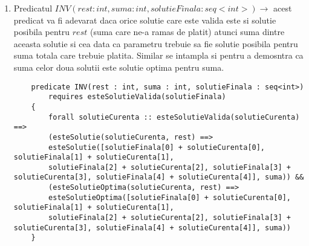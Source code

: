 \begin{enumerate}
\item Predicatul $  INV(rest : int, suma : int, solutieFinala : seq<int>) \rightarrow$ acest predicat va fi adevarat daca orice solutie care este valida este si solutie posibila pentru $rest$ (suma care ne-a ramas de platit) atunci suma dintre aceasta solutie si cea data ca parametru trebuie sa fie solutie posibila pentru suma totala care trebuie platita. Similar se intampla si pentru a demosntra ca suma celor doua solutii este solutie optima pentru suma.
\begin{lstlisting}
	predicate INV(rest : int, suma : int, solutieFinala : seq<int>)
		requires esteSolutieValida(solutieFinala)
	{
		forall solutieCurenta :: esteSolutieValida(solutieCurenta) ==>
		(esteSolutie(solutieCurenta, rest) ==> 
		esteSolutie([solutieFinala[0] + solutieCurenta[0], solutieFinala[1] + solutieCurenta[1], 
		solutieFinala[2] + solutieCurenta[2], solutieFinala[3] + solutieCurenta[3], solutieFinala[4] + solutieCurenta[4]], suma)) &&
		(esteSolutieOptima(solutieCurenta, rest) ==> 
		esteSolutieOptima([solutieFinala[0] + solutieCurenta[0], solutieFinala[1] + solutieCurenta[1],
		solutieFinala[2] + solutieCurenta[2], solutieFinala[3] + solutieCurenta[3], solutieFinala[4] + solutieCurenta[4]], suma))
	}
\end{lstlisting}
\end{enumerate}




